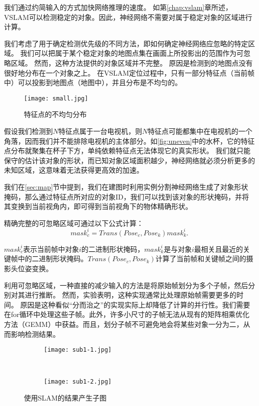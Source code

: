 我们通过约简输入的方式加快网络推理的速度。
如第\ref{chap:vslam}章所述，VSLAM可以检测稳定的对象。因此，神经网络不需要对属于稳定对象的区域进行计算。

我们考虑了用于确定检测优先级的不同方法，即如何确定神经网络应忽略的特定区域。
我们可以把属于某个稳定对象的地图点集在画面上所投影出的范围作为可忽略区域。
然而，这种方法提供的对象区域并不完整。
原因是检测到的地图点没有很好地分布在一个对象之上。
在VSLAM定位过程中，只有一部分特征点（当前帧中）可以投影到地图点（地图中），并且分布是不均匀的。

\begin{figure}[htbp]
	\centering
	\texttt{[image: small.jpg]}
	\caption{特征点的不均匀分布}
	\label{fig:uneven}
\end{figure}

假设我们检测到$N$特征点属于一台电视机，则$N$特征点可能都集中在电视机的一个角落，因而我们并不能排除电视机的主体部分。如\autoref{fig:uneven}中的水杯，它的特征点分布就聚集在杯子下方，单纯依赖特征点无法体现它的真实形状。
我们就只能保守的估计该对象的形状，而已知对象区域面积越少，神经网络就必须分析更多的未知区域，这意味着无法获得更高效的加速。

我们在\ref{sec:map}节中提到，我们在建图时利用实例分割神经网络生成了对象形状掩码，那么通过特征点所对应的对象ID，我们可以找到该对象的形状掩码，并将其变换到当前视角内，即可得到当前视角下的物体精确形状。

精确完整的可忽略区域可通过以下公式计算：
\begin{equation}\label{equ:mask}
mask_c^i = Trans(Pose_c,Pose_k)mask_k^i.
\end{equation} 

$mask_c^i$表示当前帧中对象$i$的二进制形状掩码，$mask_k^i$是与对象$i$最相关且最近的关键帧中的二进制形状掩码。$Trans(Pose_c, Pose_k)$计算了当前帧和关键帧之间的摄影头位姿变换。

利用可忽略区域，一种直接的减少输入的方法是将原始帧划分为多个子帧，然后分别对其进行推断。
然而，实验表明，这种实现通常比处理原始帧需要更多的时间。
原因是这种看似“分而治之”的实现实际上却降低了计算的并行性。我们需要在for循环中处理这些子帧。此外，许多小尺寸的子帧无法从现有的矩阵相乘优化方法（GEMM）中获益。而且，划分子帧不可避免地会将某些对象一分为二，从而影响检测结果。

\begin{figure}[htbp]
	\centering
	\begin{subfigure}{.45\linewidth}
		\texttt{[image: sub1-1.jpg]}
		\caption{}
	\end{subfigure}
	\ 
	\ 
	\ 
	\begin{subfigure}{.45\linewidth}
		\texttt{[image: sub1-2.jpg]}
		\caption{}
	\end{subfigure}
	\caption{使用SLAM的结果产生子图}\label{fig:NN for subgraph}
\end{figure}

